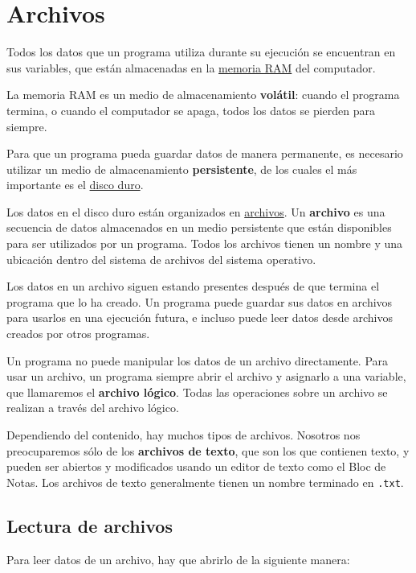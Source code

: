 \section{Archivos}

Todos los datos que un programa utiliza durante su ejecución se
encuentran en sus variables, que están almacenadas en la
\href{http://es.wikipedia.org/wiki/Memoria\_RAM}{memoria RAM} del
computador.

La memoria RAM es un medio de almacenamiento \textbf{volátil}: cuando el
programa termina, o cuando el computador se apaga, todos los datos se
pierden para siempre.

Para que un programa pueda guardar datos de manera permanente, es
necesario utilizar un medio de almacenamiento \textbf{persistente}, de
los cuales el más importante es el
\href{http://es.wikipedia.org/wiki/Disco\_duro}{disco duro}.

Los datos en el disco duro están organizados en
\href{http://es.wikipedia.org/wiki/Archivo\_(informática)}{archivos}. Un
\textbf{archivo} es una secuencia de datos almacenados en un medio
persistente que están disponibles para ser utilizados por un programa.
Todos los archivos tienen un nombre y una ubicación dentro del sistema
de archivos del sistema operativo.

Los datos en un archivo siguen estando presentes después de que termina
el programa que lo ha creado. Un programa puede guardar sus datos en
archivos para usarlos en una ejecución futura, e incluso puede leer
datos desde archivos creados por otros programas.

Un programa no puede manipular los datos de un archivo directamente.
Para usar un archivo, un programa siempre abrir el archivo y asignarlo a
una variable, que llamaremos el \textbf{archivo lógico}. Todas las
operaciones sobre un archivo se realizan a través del archivo lógico.

Dependiendo del contenido, hay muchos tipos de archivos. Nosotros nos
preocuparemos sólo de los \textbf{archivos de texto}, que son los que
contienen texto, y pueden ser abiertos y modificados usando un editor de
texto como el Bloc de Notas. Los archivos de texto generalmente tienen
un nombre terminado en \lstinline!.txt!.

\subsection{Lectura de archivos}

Para leer datos de un archivo, hay que abrirlo de la siguiente manera:

